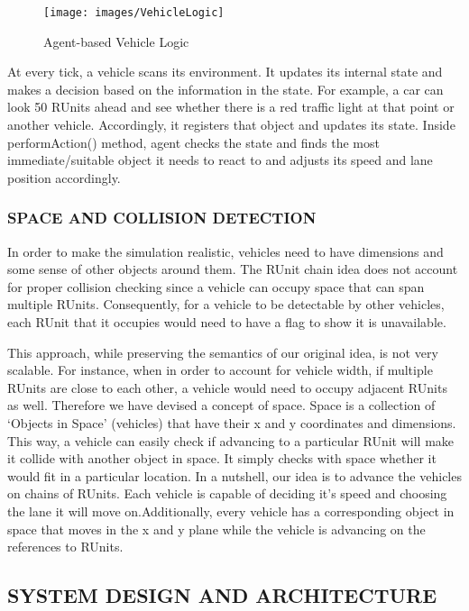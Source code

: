 \documentclass[11pt,a4paper]{article}
\begin{document}
		\begin{figure}[h]
			\texttt{[image: images/VehicleLogic]}
			\caption{Agent-based Vehicle Logic}
			\centering
		\end{figure}
  	At every tick, a vehicle scans its environment. It updates its
  	internal state and makes a decision based on the information in the
  	state. 
  	For example, a car can look 50 RUnits ahead and see whether there
  	is a red traffic light at that point or another vehicle. Accordingly, it registers that object and updates its state. Inside performAction() method, agent checks the state and finds the
  	most immediate/suitable object it needs to react to and adjusts its
  	speed and lane position accordingly. 
	
  	\subsubsection{SPACE AND COLLISION DETECTION}
  
  	In order to make the simulation realistic, vehicles need to have
  	dimensions and some sense of other objects around them. The RUnit
  	chain idea does not account for proper collision checking since a
  	vehicle can occupy space that can span multiple RUnits.
  	Consequently, for a vehicle to be detectable by other vehicles,
  	each RUnit that it occupies would need to have a flag to show it is
  	unavailable.	
	
	\setlength{\parindent}{0cm}
	This approach, while preserving the semantics of our original idea,
	is not very scalable. For instance, when in order to account for
	vehicle width, if multiple RUnits are close to each other, a
	vehicle would need to occupy adjacent RUnits as well. Therefore we
	have devised a concept of space. Space is a collection of ‘Objects
	in Space’ (vehicles) that have their x and y coordinates and
	dimensions. This way, a vehicle can easily check if advancing to a
	particular RUnit will make it collide with another object in space.
	It simply checks with space whether it would fit in a particular
	location. 
	In a nutshell, our idea is to advance the vehicles on chains of
	RUnits. Each vehicle is capable of deciding it’s speed and choosing
	the lane it will move on.Additionally, every vehicle has a
	corresponding object in space that moves in the x and y plane while
	the vehicle is advancing on the references to RUnits.
  
  \subsection{SYSTEM DESIGN AND ARCHITECTURE}
\end{document}

